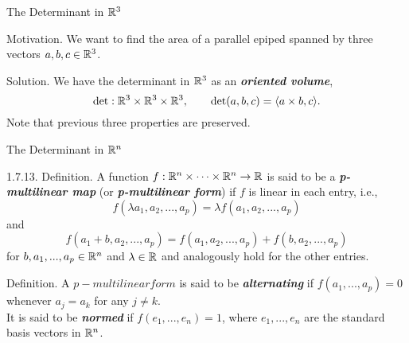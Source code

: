\documentclass[hyperref={pdfpagelabels=true}]{beamer}
\newcommand{\highlightg}[1]{\textcolor[rgb]{0.1,0.5,0.3}{\emph{\textbf{#1}}}}
\newcommand{\<}{\langle}
\renewcommand{\>}{\rangle}
\newenvironment{shrinkeq}[1]%
{ \bgroup
  \addtolength\abovedisplayshortskip{#1}
  \addtolength\abovedisplayskip{#1}
  \addtolength\belowdisplayshortskip{#1}
  \addtolength\belowdisplayskip{#1}}
{\egroup\ignorespacesafterend}
\begin{document}
    \begin{frame}{The Determinant in $\mathbb{R}^{3}$}
        \begin{block}{Motivation.}
            We want to find the area of a parallel epiped spanned by three vectors $a,b,c \in \mathbb{R}^{3}$.
        \end{block}
        \begin{block}{Solution.}
            We have the determinant in $\mathbb{R}^{3}$ as an \highlightg{oriented volume},
            \[\text{det}:\R^{3}\times\R^{3}\times\R^{3}, \qquad \text{det}(a,b,c) = \<a \times b,c\>.\]
            Note that previous three properties are preserved.
        \end{block}
    \end{frame}
    \begin{frame}{The Determinant in $\mathbb{R}^{n}$}
        \begin{block}{1.7.13. Definition.}
            A function $f:\mathbb{R}^{n}\times \cdots \times \mathbb{R}^{n} \rightarrow \mathbb{R}$ is said to be a \highlightg{p-multilinear map} (or \highlightg{p-multilinear form}) if $f$ is linear in each entry, i.e.,
            \begin{shrinkeq}{-0.3em}
            \[f(\lambda a_{1},a_{2},...,a_{p}) = \lambda f(a_{1},a_{2},...,a_{p})\]
            \end{shrinkeq}
            and
            \begin{shrinkeq}{-0.3em}
            \[f(a_{1}+b,a_{2},...,a_{p}) = f(a_{1},a_{2},...,a_{p})+f(b,a_{2},...,a_{p})\]
            \end{shrinkeq}
            for $b,a_{1},...,a_{p} \in \mathbb{R}^{n}$ and $\lambda \in \mathbb{R}$ and analogously hold for the other entries.
        \end{block}
        \begin{block}{Definition.}
            A $p-multilinear form $ is said to be \highlightg{alternating} if $f(a_{1},...,a_{p}) = 0$ whenever $a_{j} = a_{k}$ for any $j \neq k$.\\
            It is said to be \highlightg{normed} if $f(e_{1},...,e_{n}) = 1$, where $e_{1},...,e_{n}$ are the standard basis vectors in $\mathbb{R}^{n}$.
        \end{block}
    \end{frame} 
\end{document}
